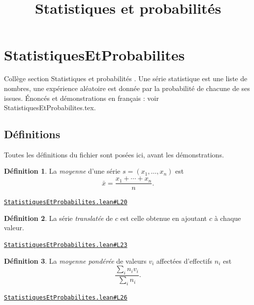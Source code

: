 \documentclass[11pt,a4paper]{article}
\title{Statistiques et probabilités}
\date{}
\theoremstyle{definition}
\newtheorem{definition}{Définition}
\theoremstyle{plain}
\newcommand{\source}[2]{\par\smallskip\noindent\hfill{\footnotesize\href{#1}{\texttt{#2}}}\par\smallskip}
\begin{document}
\maketitle
\sloppy

\section{StatistiquesEtProbabilites}

\noindent
Collège \textemdash{} section \og{} Statistiques et probabilités \fg{}.
Une série statistique est une liste de nombres, une expérience aléatoire est donnée par
la probabilité de chacune de ses issues.
Énoncés et démonstrations en français : voir StatistiquesEtProbabilites.tex.

\subsection{Définitions}

\noindent
Toutes les définitions du fichier sont posées ici, avant les démonstrations.

\begin{definition}
La \emph{moyenne} d'une série $s = (x_1, \dots, x_n)$ est
\[ \bar{x} = \frac{x_1 + \cdots + x_n}{n} . \]
\end{definition}
\source{https://github.com/Commutator-IO/learn-lean/blob/main/courses/01-college/06-statistiques-et-probabilites/StatistiquesEtProbabilites.lean\#L20}{StatistiquesEtProbabilites.lean\#L20}

\begin{definition}
La série \emph{translatée} de $c$ est celle obtenue en ajoutant $c$ à chaque valeur.
\end{definition}
\source{https://github.com/Commutator-IO/learn-lean/blob/main/courses/01-college/06-statistiques-et-probabilites/StatistiquesEtProbabilites.lean\#L23}{StatistiquesEtProbabilites.lean\#L23}

\begin{definition}
La \emph{moyenne pondérée} de valeurs $v_i$ affectées d'effectifs $n_i$ est
\[ \frac{\sum_i n_i v_i}{\sum_i n_i} . \]
\end{definition}
\source{https://github.com/Commutator-IO/learn-lean/blob/main/courses/01-college/06-statistiques-et-probabilites/StatistiquesEtProbabilites.lean\#L26}{StatistiquesEtProbabilites.lean\#L26}
\end{document}
